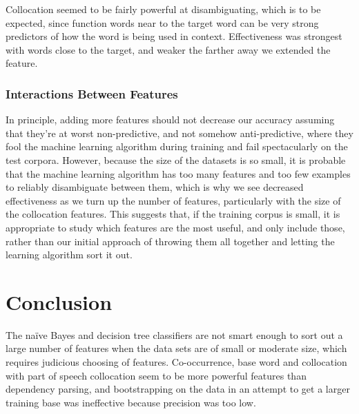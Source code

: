 \documentclass{article}
\newcommand{\naive}{na\"ive}
\begin{document}
Collocation seemed to be fairly powerful at disambiguating, which is to be
expected, since function words near to the target word can be very strong
predictors of how the word is being used in context.  Effectiveness was
strongest with words close to the target, and weaker the farther away we
extended the feature.

\subsubsection{Interactions Between Features}

In principle, adding more features should not decrease our accuracy assuming
that they're at worst non-predictive, and not somehow anti-predictive, where
they fool the machine learning algorithm during training and fail spectacularly
on the test corpora.  However, because the size of the datasets is so small, it
is probable that the machine learning algorithm has too many features and too
few examples to reliably disambiguate between them, which is why we see
decreased effectiveness as we turn up the number of features, particularly with
the size of the collocation features.  This suggests that, if the training
corpus is small, it is appropriate to study which features are the most useful,
and only include those, rather than our initial approach of throwing them all
together and letting the learning algorithm sort it out.


\section{Conclusion}

The \naive{} Bayes and decision tree classifiers are not smart enough to sort out
a large number of features when the data sets are of small or moderate size,
which requires judicious choosing of features.  Co-occurrence, base word and
collocation with part of speech collocation seem to be more powerful features
than dependency parsing, and bootstrapping on the data in an attempt to get a
larger training base was ineffective because precision was too low.
\end{document}
